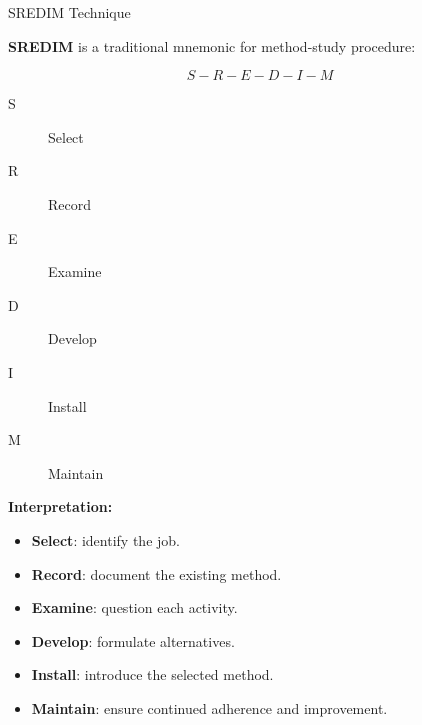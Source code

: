\documentclass[aspectratio=169,10pt]{beamer}
\begin{document}

\begin{frame}[shrink=18]{SREDIM Technique}
\small

\textbf{SREDIM} is a traditional mnemonic for method-study procedure:

\[
\boxed{
S-R-E-D-I-M
}
\]

\begin{description}
    \item[S] Select
    \item[R] Record
    \item[E] Examine
    \item[D] Develop
    \item[I] Install
    \item[M] Maintain
\end{description}

\vspace{4pt}

\textbf{Interpretation:}

\begin{itemize}
    \item \textbf{Select}: identify the job.
    \item \textbf{Record}: document the existing method.
    \item \textbf{Examine}: question each activity.
    \item \textbf{Develop}: formulate alternatives.
    \item \textbf{Install}: introduce the selected method.
    \item \textbf{Maintain}: ensure continued adherence and improvement.
\end{itemize}

\end{frame}

\end{document}
